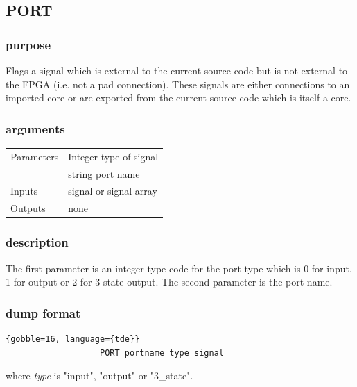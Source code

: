 \documentclass[10pt,a4paper,twoside,fleqn]{book}
\begin{document}
        \subsection{PORT}

            \subsubsection{purpose}
            
                Flags a signal which is external to the current source code but
                is not external to the FPGA (i.e. not a pad connection). These
                signals are either connections to an imported core or are
                exported from the current source code which is itself a core.
                
            \subsubsection{arguments}
            
                \begin{tabular}{| l | l |}
                \hline
                Parameters  & Integer type of signal \\
                            & string  port name \\
                \hline
                Inputs      & signal or signal array \\
                \hline
                Outputs     & none \\
                \hline
                \end{tabular}

            \subsubsection{description}

                 The first parameter is an integer type code for the port type
                 which is 0 for input, 1 for output or 2 for 3-state output.
                 The second parameter is the port name.
            
            \subsubsection{dump format}
            
                \begin{lstlisting}{gobble=16, language={tde}}
                   PORT portname type signal
                \end{lstlisting}
                where {\em type} is "input", "output" or "3\_state".
\end{document}
